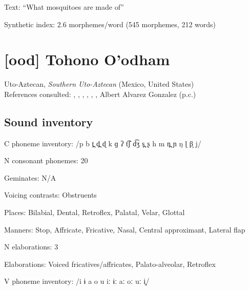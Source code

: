 {\begin{appendixdesc}
\item[Text:] “What mosquitoes are made of” \citep[133--143]{Stonham1999}

\item[Synthetic index:] 2.6 morphemes/word (545 morphemes, 212 words)
\end{appendixdesc}
\section*{[ood] Tohono O’odham}   %
Uto-Aztecan, \textit{Southern Uto-Aztecan} (Mexico, United States)\medskip\\
References consulted: \citet{DoloresMathiot1991}, \citet{Fitzgerald1994}, \citet{Hale1959}, \citet{HillZepeda1992}, \citet{Saxton1963}, \citet{Saxton1982}, Albert Alvarez Gonzalez (p.c.)

\subsection*{Sound inventory}
\begin{appendixdesc}

\item[C phoneme inventory:] /p b t̪ d̪ ɖ k ɡ ʔ t͡ʃ d͡ʒ s̪ ʂ h m n̪ ɲ ŋ ɭ β̞ j/

\item[N consonant phonemes:] 20

\item[Geminates:] N/A

\item[Voicing contrasts:] Obstruents

\item[Places:] Bilabial, Dental, Retroflex, Palatal, Velar, Glottal

\item[Manners:] Stop, Affricate, Fricative, Nasal, Central approximant, Lateral flap

\item[N elaborations:] 3

\item[Elaborations:] Voiced fricatives/affricates, Palato-alveolar, Retroflex

\item[V phoneme inventory:] /i ɨ a o u iː ɨː aː oː uː i̥/


\end{appendixdesc}}
